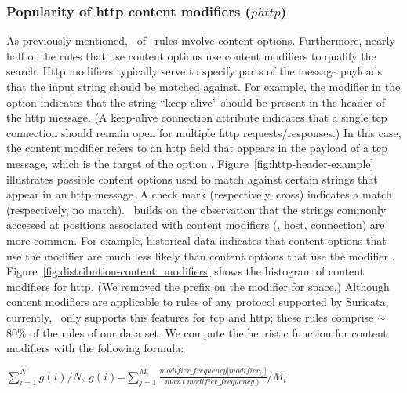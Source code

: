 \documentclass[conference]{IEEEtran}
\begin{document}
\subsubsection{\label{sec:popularity-content-modifiers}Popularity of http content modifiers ($phttp$)} 
As previously mentioned, \percRulesWithContent\ of \suri\ rules involve content
options. Furthermore, nearly half of the rules that use content
options use content modifiers to qualify the search. Http modifiers
typically serve to specify parts of the message payloads that the
input string should be matched against. For example, the modifier
 in the option  indicates that the string ``keep-alive'' should be
present in the header of the http message. (A keep-alive connection
attribute indicates that a single tcp connection should remain open
for multiple http requests/responses.) In this case, the content
modifier refers to an http field that appears in the payload of a tcp
message, which is the target of the option
. Figure~\ref{fig:http-header-example} illustrates
possible content options used to match against certain strings that
appear in an http message. A check mark (respectively, cross)
indicates a match (respectively, no match).
\tname\ builds on the observation that the strings commonly accessed
at positions associated with content modifiers (\eg{}, host,
connection) are more common. For example, historical data indicates
that content options that use the modifier  are
much less likely than content options that use the modifier
. Figure~\ref{fig:distribution-content_modifiers} shows
the histogram of content modifiers for http. (We removed the prefix
 on the modifier for space.) Although content modifiers
are applicable to rules of any protocol supported by Suricata,
currently, \tname\ only supports this features for tcp and http; these
rules comprise $\sim$80\% of the rules of our data set. We compute the
heuristic function for content modifiers with the following formula:

\indent
$\sum_{i=1}^{N}g(i)/N,~g(i)$=$\sum_{j=1}^{M_i}\frac{\mathit{modifier\_frequency[modifier_{ij}}]}{\mathit{max(modifier\_frequency)}}/M_i$
\end{document}
